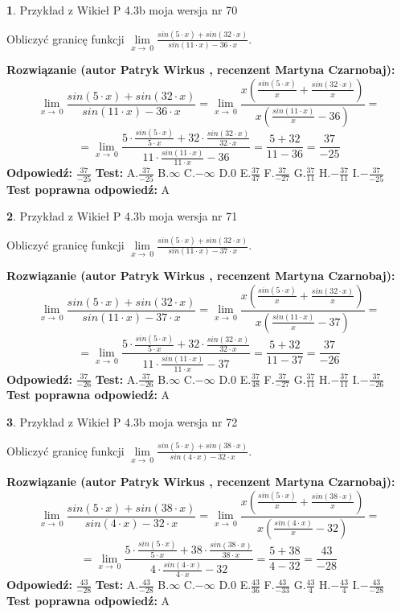 \documentclass[12pt, a4paper]{article}
\theoremstyle{definition} %
\newtheorem{zad}{}
\newcommand{\zadStart}[1]{\begin{zad}#1\newline}
\newcommand{\zadStop}{\end{zad}}
\newcommand{\rozwStart}[2]{\noindent \textbf{Rozwiązanie (autor #1 , recenzent #2): }\newline}
\newcommand{\rozwStop}{\newline}
\newcommand{\odpStart}{\noindent \textbf{Odpowiedź:}\newline}
\newcommand{\odpStop}{\newline}
\newcommand{\testStart}{\noindent \textbf{Test:}\newline}
\newcommand{\testStop}{\newline}
\newcommand{\kluczStart}{\noindent \textbf{Test poprawna odpowiedź:}\newline}
\newcommand{\kluczStop}{\newline}
\begin{document}
\zadStart{Przykład z Wikieł P 4.3b moja wersja nr 70}


Obliczyć granicę funkcji $\lim\limits_{x\to\ 0}\frac{sin(5 \cdot x)+sin(32 \cdot x)}{sin(11 \cdot x)-36 \cdot x}$.
\zadStop
\rozwStart{Patryk Wirkus}{Martyna Czarnobaj}
$$\lim\limits_{x\to\ 0}\frac{sin(5 \cdot x)+sin(32 \cdot x)}{sin(11 \cdot x)-36 \cdot x}=\lim\limits_{x\to\ 0}\frac{x(\frac{sin(5 \cdot x)}{x}+\frac{sin(32 \cdot x)}{x})}{x(\frac{sin(11 \cdot x)}{x}-36)}=$$
$$=\lim\limits_{x\to\ 0}\frac{5 \cdot \frac{sin(5 \cdot x)}{5 \cdot x}+32 \cdot \frac{sin(32 \cdot x)}{32 \cdot x}}{11 \cdot \frac{sin(11 \cdot x)}{11 \cdot x}-36}=\frac{5+32}{11-36} = \frac{37}{-25}$$
\rozwStop
\odpStart
$\frac{37}{-25}$
\odpStop
\testStart
A.$\frac{37}{-25}$
B.$\infty$
C.$-\infty$
D.$0$
E.$\frac{37}{47}$
F.$\frac{37}{-27}$
G.$\frac{37}{11}$
H.$-\frac{37}{11}$
I.$-\frac{37}{-25}$
\testStop
\kluczStart
A
\kluczStop



\zadStart{Przykład z Wikieł P 4.3b moja wersja nr 71}


Obliczyć granicę funkcji $\lim\limits_{x\to\ 0}\frac{sin(5 \cdot x)+sin(32 \cdot x)}{sin(11 \cdot x)-37 \cdot x}$.
\zadStop
\rozwStart{Patryk Wirkus}{Martyna Czarnobaj}
$$\lim\limits_{x\to\ 0}\frac{sin(5 \cdot x)+sin(32 \cdot x)}{sin(11 \cdot x)-37 \cdot x}=\lim\limits_{x\to\ 0}\frac{x(\frac{sin(5 \cdot x)}{x}+\frac{sin(32 \cdot x)}{x})}{x(\frac{sin(11 \cdot x)}{x}-37)}=$$
$$=\lim\limits_{x\to\ 0}\frac{5 \cdot \frac{sin(5 \cdot x)}{5 \cdot x}+32 \cdot \frac{sin(32 \cdot x)}{32 \cdot x}}{11 \cdot \frac{sin(11 \cdot x)}{11 \cdot x}-37}=\frac{5+32}{11-37} = \frac{37}{-26}$$
\rozwStop
\odpStart
$\frac{37}{-26}$
\odpStop
\testStart
A.$\frac{37}{-26}$
B.$\infty$
C.$-\infty$
D.$0$
E.$\frac{37}{48}$
F.$\frac{37}{-27}$
G.$\frac{37}{11}$
H.$-\frac{37}{11}$
I.$-\frac{37}{-26}$
\testStop
\kluczStart
A
\kluczStop



\zadStart{Przykład z Wikieł P 4.3b moja wersja nr 72}


Obliczyć granicę funkcji $\lim\limits_{x\to\ 0}\frac{sin(5 \cdot x)+sin(38 \cdot x)}{sin(4 \cdot x)-32 \cdot x}$.
\zadStop
\rozwStart{Patryk Wirkus}{Martyna Czarnobaj}
$$\lim\limits_{x\to\ 0}\frac{sin(5 \cdot x)+sin(38 \cdot x)}{sin(4 \cdot x)-32 \cdot x}=\lim\limits_{x\to\ 0}\frac{x(\frac{sin(5 \cdot x)}{x}+\frac{sin(38 \cdot x)}{x})}{x(\frac{sin(4 \cdot x)}{x}-32)}=$$
$$=\lim\limits_{x\to\ 0}\frac{5 \cdot \frac{sin(5 \cdot x)}{5 \cdot x}+38 \cdot \frac{sin(38 \cdot x)}{38 \cdot x}}{4 \cdot \frac{sin(4 \cdot x)}{4 \cdot x}-32}=\frac{5+38}{4-32} = \frac{43}{-28}$$
\rozwStop
\odpStart
$\frac{43}{-28}$
\odpStop
\testStart
A.$\frac{43}{-28}$
B.$\infty$
C.$-\infty$
D.$0$
E.$\frac{43}{36}$
F.$\frac{43}{-33}$
G.$\frac{43}{4}$
H.$-\frac{43}{4}$
I.$-\frac{43}{-28}$
\testStop
\kluczStart
A
\kluczStop
\end{document}
